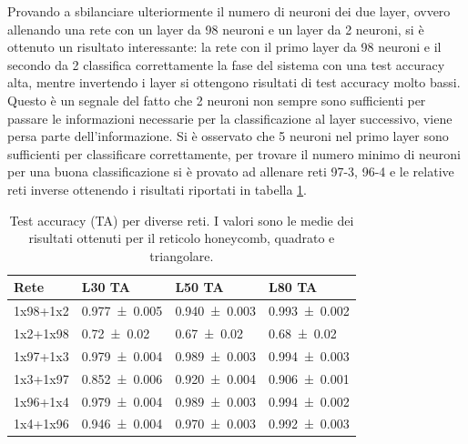 \documentclass{article}
\begin{document}
Provando a sbilanciare ulteriormente il numero di neuroni dei due layer, ovvero allenando una rete con un layer da 98 neuroni e un layer da 2 neuroni, si è ottenuto un risultato interessante: la rete con il primo layer da 98 neuroni e il secondo da 2 classifica correttamente la fase del sistema con una test accuracy alta, mentre invertendo i layer si ottengono risultati di test accuracy molto bassi.
Questo è un segnale del fatto che 2 neuroni non sempre sono sufficienti per passare le informazioni necessarie per la classificazione al layer successivo, viene persa parte dell'informazione.
Si è osservato che 5 neuroni nel primo layer sono sufficienti per classificare correttamente, per trovare il numero minimo di neuroni per una buona classificazione si è provato ad allenare reti 97-3, 96-4 e le relative reti inverse ottenendo i risultati riportati in tabella \ref{tab:2LN2-3-4}.

\begin{table}[ht]
\begin{center}
\begin{tabular}{llll}
\toprule
Rete & L30 TA & L50 TA & L80 TA \\
\midrule
1x98+1x2 & \num{0.977 \pm 0.005} & \num{0.940 \pm 0.003} & \num{0.993 \pm 0.002}\\
1x2+1x98 & \num{0.72 \pm 0.02} & \num{0.67\pm 0.02} & \num{0.68 \pm 0.02}\\
\midrule
1x97+1x3 & \num{0.979 \pm 0.004} & \num{0.989 \pm 0.003} & \num{0.994 \pm 0.003}\\
1x3+1x97 & \num{0.852 \pm 0.006} & \num{0.920 \pm 0.004} & \num{0.906 \pm 0.001}\\
\midrule
1x96+1x4 & \num{0.979 \pm 0.004} & \num{0.989 \pm 0.003} & \num{0.994 \pm 0.002}\\
1x4+1x96 & \num{0.946 \pm 0.004} & \num{0.970 \pm 0.003} & \num{0.992 \pm 0.003}\\
\bottomrule
\end{tabular}
\end{center}
\caption{Test accuracy (TA) per diverse reti. I valori sono le medie dei risultati ottenuti per il reticolo honeycomb, quadrato e triangolare.}
\label{tab:2LN2-3-4}
\end{table}
\end{document}
